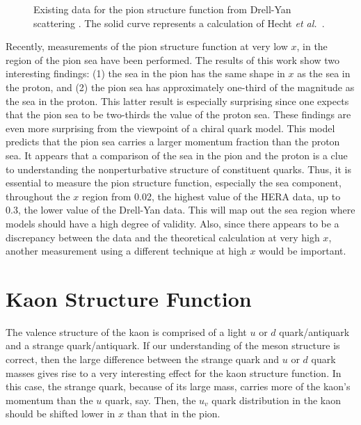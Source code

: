   
\begin{figure}[tb] %
\centerline{}
\caption{Existing data for the pion structure function from Drell-Yan
         scattering \protect\cite{conway}.  The solid curve represents
         a calculation of Hecht {\it et al.}~\protect\cite{hecht}. }
\label{fig1}
\end{figure}
   
Recently, measurements of the pion structure function\cite{adloff} at
very low $x$, in the region of the pion sea have been performed.  The
results of this work show two interesting findings: (1) the sea in the
pion has the same shape in $x$ as the sea in the proton, and (2) the
pion sea has approximately one-third of the magnitude as the sea in
the proton.  This latter result is especially surprising since one
expects that the pion sea to be two-thirds the value of the proton
sea.  These findings are even more surprising from the viewpoint of a
chiral quark model\cite{weise}.  This model predicts that the pion sea
carries a larger momentum fraction than the proton sea.  It appears
that a comparison of the sea in the pion and the proton is a clue to
understanding the nonperturbative structure of constituent quarks.
Thus, it is essential to measure the pion structure function,
especially the sea component, throughout the $x$ region from 0.02, the
highest value of the HERA data, up to 0.3, the lower value of the
Drell-Yan data.  This will map out the sea region where models should
have a high degree of validity.  Also, since there appears to be a
discrepancy between the data and the theoretical calculation at very
high $x$, another measurement using a different technique at high $x$
would be important.

\section*{Kaon Structure Function}

The valence structure of the kaon is comprised of a light $u$ or $d$
quark/antiquark and a strange quark/antiquark.  If our understanding
of the meson structure is correct, then the large difference between
the strange quark and $u$ or $d$ quark masses gives rise to a very
interesting effect for the kaon structure function.  In this case, the
strange quark, because of its large mass, carries more of the kaon's
momentum than the $u$ quark, say.  Then, the $u_v$ quark distribution
in the kaon should be shifted lower in $x$ than that in the pion.

